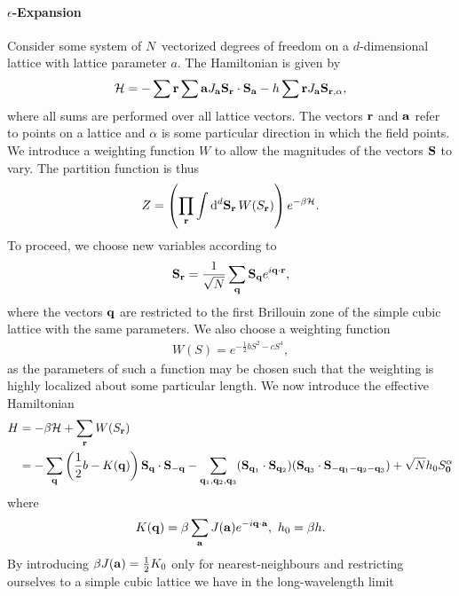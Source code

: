 \paragraph{$\epsilon$-Expansion}
Consider some system of $N$ vectorized degrees of freedom on a $d$-dimensional lattice with lattice parameter $a$. The  Hamiltonian is given by
\begin{align*}
	\mathcal{H} = -\sum\limits{\vb{r}}\sum\limits{\vb{a}}J_{\vb{a}}\vb{S}_{\vb{r}}\cdot\vb{S}_{\vb{a}} - h\sum\limits{\vb{r}}J_{\vb{a}}\vb{S}_{\vb{r}, \alpha},
\end{align*}
where all sums are performed over all lattice vectors. The vectors $\vb{r}$ and $\vb{a}$ refer to points on a lattice and $\alpha$ is some particular direction in which the field points. We introduce a weighting function $W$ to allow the magnitudes of the vectors $\vb{S}$ to vary. The partition function is thus
\begin{align*}
	Z = \left(\prod\limits_{\vb{r}}\int\limits_{}^{}\dd[d]{\vb{S}_{\vb{r}}}W(S_{\vb{r}})\right)e^{-\beta\mathcal{H}}.
\end{align*}
To proceed, we choose new variables according to
\begin{align*}
	\vb{S}_{\vb{r}} = \frac{1}{\sqrt{N}}\sum\limits_{\vb{q}}\vb{S}_{\vb{q}}e^{i\vb{q}\cdot\vb{r}},
\end{align*}
where the vectors $\vb{q}$ are restricted to the first Brillouin zone of the simple cubic lattice with the same parameters. We also choose a weighting function
\begin{align*}
	W(S) = e^{-\frac{1}{2}bS^{2} - cS^{4}},
\end{align*}
as the parameters of such a function may be chosen such that the weighting is highly localized about some particular length. We now introduce the effective Hamiltonian
\begin{align*}
	H &= -\beta\mathcal{H} + \sum\limits_{\vb{r}}W(S_{\vb{r}}) \\
	  &= -\sum\limits_{\vb{q}}\left(\frac{1}{2}b - K(\vb{q})\right)\vb{S}_{\vb{q}}\cdot\vb{S}_{-\vb{q}} - \sum\limits_{\vb{q}_{1}, \vb{q}_{2}, \vb{q}_{3}}(\vb{S}_{\vb{q}_{1}}\cdot\vb{S}_{\vb{q}_{2}})(\vb{S}_{\vb{q}_{3}}\cdot\vb{S}_{-\vb{q}_{1} - \vb{q}_{2} - \vb{q}_{3}}) + \sqrt{N}h_{0}S_{\vb{0}}^{\alpha}
\end{align*}
where
\begin{align*}
	K(\vb{q}) = \beta\sum\limits_{\vb{a}}J(\vb{a})e^{-i\vb{q}\cdot\vb{a}},\ h_{0} = \beta h.
\end{align*}
By introducing $\beta J(\vb{a}) = \frac{1}{2}K_{0}$ only for nearest-neighbours and restricting ourselves to a simple cubic lattice we have in the long-wavelength limit
